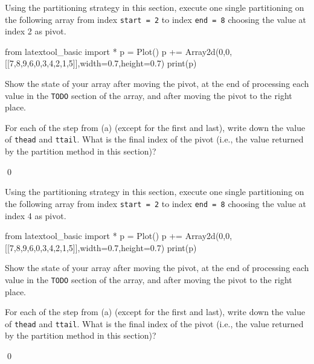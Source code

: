 \newpage
\begin{ex}
\begin{tightlist}
\item Using the partitioning strategy in this section,
execute one single partitioning on the following array
from index \verb!start = 2! to index \verb!end = 8!
choosing the value at index 2 as pivot.

\begin{python}
from latextool_basic import *
p = Plot()
p += Array2d(0,0,[[7,8,9,6,0,3,4,2,1,5]],width=0.7,height=0.7)
print(p)
\end{python}

Show the state of your array after moving the pivot, at the end of
processing each value in the \verb!TODO! section of the array,
and after moving the pivot to the right place.

\item For each of the step from (a) (except for the first and last),
write down the value of \verb!thead! and \verb!ttail!.
What is the final index of the pivot (i.e., the value returned
by the partition method in this section)? 

\end{tightlist}
\qed
\end{ex}

\newpage
\begin{ex}
\begin{tightlist}
\item Using the partitioning strategy in this section,
execute one single partitioning on the following array
from index \verb!start = 2! to index \verb!end = 8!
choosing the value at index 4 as pivot.

\begin{python}
from latextool_basic import *
p = Plot()
p += Array2d(0,0,[[7,8,9,6,0,3,4,2,1,5]],width=0.7,height=0.7)
print(p)
\end{python}

Show the state of your array after moving the pivot, at the end of
processing each value in the \verb!TODO! section of the array,
and after moving the pivot to the right place.

\item For each of the step from (a) (except for the first and last),
write down the value of \verb!thead! and \verb!ttail!.
What is the final index of the pivot (i.e., the value returned
by the partition method in this section)? 

\end{tightlist}
\qed
\end{ex}



